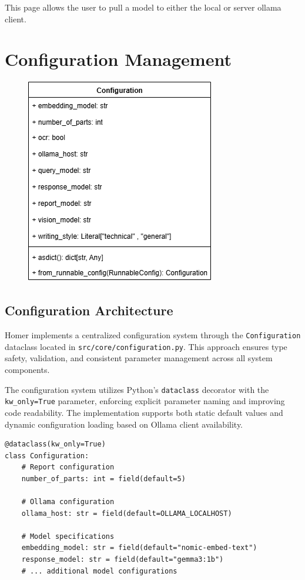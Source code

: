 \documentclass[11pt,a4paper]{report}
\begin{document}
This page allows the user to pull a model to either the local or server ollama client.

\section{Configuration Management}

\begin{figure}[H]
    \centering
    \includegraphics[width=0.5\linewidth]{static/schemas/classDiagramConfiguration.drawio.png}
    \label{fig:configuration}
\end{figure}

\subsection{Configuration Architecture}

Homer implements a centralized configuration system through the \texttt{Configuration} dataclass located in \texttt{src/core/configuration.py}. This approach ensures type safety, validation, and consistent parameter management across all system components.

The configuration system utilizes Python's \texttt{dataclass} decorator with the \texttt{kw\_only=True} parameter, enforcing explicit parameter naming and improving code readability. The implementation supports both static default values and dynamic configuration loading based on Ollama client availability.

\begin{lstlisting}[caption={Configuration dataclass structure}]
@dataclass(kw_only=True)
class Configuration:
    # Report configuration
    number_of_parts: int = field(default=5)
    
    # Ollama configuration  
    ollama_host: str = field(default=OLLAMA_LOCALHOST)
    
    # Model specifications
    embedding_model: str = field(default="nomic-embed-text")
    response_model: str = field(default="gemma3:1b")
    # ... additional model configurations
\end{lstlisting}
\end{document}
